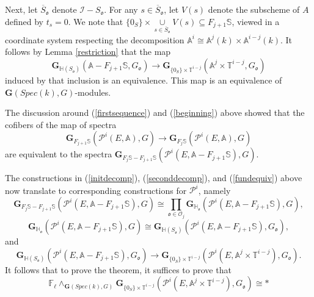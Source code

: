 \documentclass[11pt]{article}
\newcommand\mb{\mathbb}
\newcommand\mc{\mathcal}
\newcommand\mfk{\mathbf G}
\begin{document}
Next, let $\overline{S}_{\mathfrak{o}}$ denote $\mathcal{I}- S_{\mathfrak{o}}$.  For any $s \in \overline{S}_{\mathfrak{o}}$, let $V(s)$ denote the subscheme of $A$ defined by $t_s = 0$. 
We note that $\{ 0 _S\} \times \underset{s \in \overline{S}_{\mathfrak{o}}}{\cup}V(s) \subseteq  F_{j+1}\mb{S} $, viewed in a coordinate system  respecting the decomposition $\mb{A}^i\cong \mb{A}^{j}(k) \times \mb{A}^{i-j}(k)$. It follows by Lemma \ref{restriction} that the map
\begin{equation}\label{fundequiv} \mfk_{\mb{H}(S_\mathfrak{o})}(\mb{A}- F_{j+1} \mb{S}, G_{\mathfrak{o}}) \rightarrow \mfk_{\{ 0 _S\} \times \mb{T}^{i-j}}(\mb{A}^{j}\times \mb{T}^{i-j}, {G}_{\mathfrak{o}})
\end{equation}
induced by that inclusion is an equivalence.  
This map  is an equivalence of $\mfk(Spec(k), G)$-modules. 

The discussion around (\ref{firstsequence}) and (\ref{beginning}) above showed that the cofibers of the map of spectra 
$$ \mfk_{F_{j+1}\mb{S}}(\mc{P}^i(E, \mb{A}), G) \rightarrow \mfk_{F_{j}\mb{S}}(\mc{P}^i(E, \mb{A}), G) 
$$
are equivalent to the spectra $\mfk_{F_j\mb{S} - F_{j+1}\mb{S}}(\mc{P}^i (E
,{\mb{A}-F_{j+1} \mb{S}}), G)$.

The constructions in (\ref{initdecomp}), (\ref{seconddecomp}), and (\ref{fundequiv}) above now translate  to corresponding constructions for $\mc{P}^i $, namely 
\begin{equation} \mfk_{F_{j}\mb{S}- F_{j+1} \mb{S}}(\mc{P}^i(E ,{\mb{A}- F_{j+1}\mb{S}}), G) \cong \prod _{\mathfrak{o} \in \mc{O}_j}\mfk_{\mb{H}_{\mathfrak{o}}}(\mc{P}^i(E,{\mb{A}- F_{j+1} \mb{S}}), G),
\end{equation}
\begin{equation}
    \mfk_{\mb{H}_{\mathfrak{o}}}(\mc{P}^i(E,{\mb{A}- F_{j+1} \mb{S}}), G) \cong \mfk_{\mb{H}(S_\mathfrak{o})}(\mc{P}^i(E,{\mb{A}- F_{j+1} \mb{S}}), G_{\mathfrak{o}}),
\end{equation}
and 
\begin{equation}  \mfk_{\mb{H}(S_\mathfrak{o})}(\mc{P}^i(E,{\mb{A}- F_{j+1} \mb{S}}), G_{\mathfrak{o}}) \rightarrow \mfk_{\{ 0 _S\} \times \mb{T}^{i-j}}(\mc{P}^i(E,{\mb{A}^{j}\times \mb{T}^{i-j}}), {G}_{\mathfrak{o}}).
\end{equation}
It follows that to prove the theorem, it suffices to prove that 
$$ \mb{F}_{\ell} \wedge _{\mfk(Spec(k), G)}\mfk_{\{ 0 _S\} \times \mb{T}^{i-j}}(\mc{P}^i(E,{\mb{A}^{j}\times \mb{T}^{i-j}}), {G}_{\mathfrak{o}}) \cong *
$$
\end{document}
